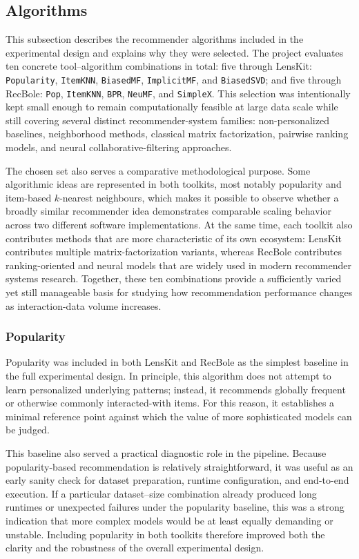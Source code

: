 \documentclass[12pt,a4paper]{article}
\begin{document}
\subsection{Algorithms}
This subsection describes the recommender algorithms included in the experimental design and explains why they were selected. The project evaluates ten concrete tool--algorithm combinations in total: five through LensKit: \texttt{Popularity}, \texttt{ItemKNN}, \texttt{BiasedMF}, \texttt{ImplicitMF}, and \texttt{BiasedSVD}; and five through RecBole: \texttt{Pop}, \texttt{ItemKNN}, \texttt{BPR}, \texttt{NeuMF}, and \texttt{SimpleX}. This selection was intentionally kept small enough to remain computationally feasible at large data scale while still covering several distinct recommender-system families: non-personalized baselines, neighborhood methods, classical matrix factorization, pairwise ranking models, and neural collaborative-filtering approaches.

The chosen set also serves a comparative methodological purpose. Some algorithmic ideas are represented in both toolkits, most notably popularity and item-based $k$-nearest neighbours, which makes it possible to observe whether a broadly similar recommender idea demonstrates comparable scaling behavior across two different software implementations. At the same time, each toolkit also contributes methods that are more characteristic of its own ecosystem: LensKit contributes multiple matrix-factorization variants, whereas RecBole contributes ranking-oriented and neural models that are widely used in modern recommender systems research. Together, these ten combinations provide a sufficiently varied yet still manageable basis for studying how recommendation performance changes as interaction-data volume increases.

\subsubsection{Popularity}
Popularity was included in both LensKit and RecBole as the simplest baseline in the full experimental design. In principle, this algorithm does not attempt to learn personalized underlying patterns; instead, it recommends globally frequent or otherwise commonly interacted-with items. For this reason, it establishes a minimal reference point against which the value of more sophisticated models can be judged.

This baseline also served a practical diagnostic role in the pipeline. Because popularity-based recommendation is relatively straightforward, it was useful as an early sanity check for dataset preparation, runtime configuration, and end-to-end execution. If a particular dataset--size combination already produced long runtimes or unexpected failures under the popularity baseline, this was a strong indication that more complex models would be at least equally demanding or unstable. Including popularity in both toolkits therefore improved both the clarity and the robustness of the overall experimental design.
\end{document}
